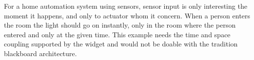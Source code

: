 \documentclass[../report.tex]{subfiles}
\begin{document}
For a home automation system using sensors, sensor input is only interesting the moment it happens, and only to actuator whom it concern. When a person enters the room the light should go on instantly, only in the room where the person entered and only at the given time. This example needs the time and space coupling supported by the widget and would not be doable with the tradition blackboard architecture.
\end{document}
